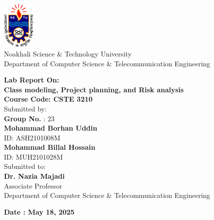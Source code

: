 \documentclass[a4paper,12pt]{article}
\begin{document}
\thispagestyle{empty} 
\begin{center}
    \includegraphics[width=0.12\textwidth]{photos/logo.png}  \\[1.5em]
    {\LARGE Noakhali Science \& Technology University} \\
    Department of Computer Science \& Telecommunication Engineering
\end{center}

\vspace{3.5cm}

\begin{center}
    \textbf{\huge Lab Report On:} \\[0.5em]
   \textbf{\LARGE Class modeling, Project planning, and
Risk analysis} \\[1em]
      \textbf{\Large Course Code: CSTE 3210}  \\[1.5em]
    {\large Submitted by:} \\[0.6em]
     {\large   \textbf {Group No.} : 23}  \\ [0.6em ]
     \textbf {\large Mohammad Borhan Uddin }  \\
  {\large ID: ASH2101008M}  \\ [0.6em ]
    \textbf{\large Mohammad Billal Hossain}  \\
    {\large ID: MUH2101028M}  \\ [2em]

    
    {\large Submitted to:} \\[0.6em]
    \textbf{\large Dr. Nazia Majadi} \\ 
    {\large Associate Professor} \\ 
     {Department of Computer Science \& Telecommunication Engineering} \\ 
\end{center}

\vspace{5cm}

\begin{center}
    \textbf{\LARGE Date : May 18, 2025}
\end{center}
\thispagestyle{empty} 

\tableofcontents

\thispagestyle{empty}
\newpage
\end{document}
